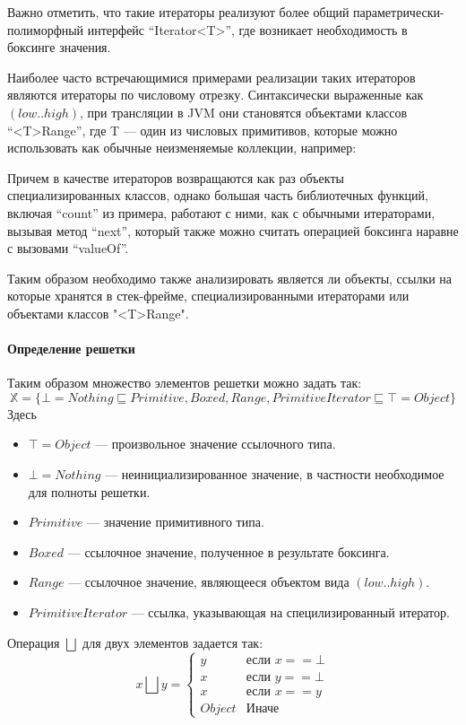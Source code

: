Важно отметить, что такие итераторы реализуют более общий параметрически-полиморфный интерфейс
``Iterator<T>'', где возникает необходимость в боксинге значения.

Наиболее часто встречающимися примерами реализации таких итераторов являются итераторы
по числовому отрезку. Синтаксически выраженные как $(low..high)$, при трансляции в JVM они
становятся объектами классов ``<T>Range'', где T --- один из числовых примитивов, которые можно
использовать как обычные неизменяемые коллекции, например:

Причем в качестве итераторов возвращаются как раз объекты специализированных классов, однако
большая часть библиотечных функций, включая ``count'' из примера, работают с ними, как с обычными
итераторами, вызывая метод ``next'', который также можно считать операцией боксинга наравне
с вызовами ``valueOf''.

Таким образом необходимо также анализировать является ли объекты, ссылки на которые хранятся
в стек-фрейме, специализированными итераторами или объектами классов "<T>Range".

\paragraph{Определение решетки}
Таким образом множество элементов решетки можно задать так:
$$\mathbb{X} = \{\bot = Nothing \sqsubseteq  Primitive, Boxed, Range, PrimitiveIterator \sqsubseteq \top = Object \}$$
Здесь
\begin{itemize}
    \item $\top = Object$ --- произвольное значение ссылочного типа.
    \item $\bot = Nothing$ --- неинициализированное значение, в частности необходимое для полноты
    решетки.
    \item $Primitive$ --- значение примитивного типа.
    \item $Boxed$ --- ссылочное значение, полученное в результате боксинга.
    \item $Range$ --- ссылочное значение, являющееся объектом вида $(low..high)$.
    \item $PrimitiveIterator$ --- ссылка, указывающая на специлизированный итератор.
\end{itemize}

Операция $\bigsqcup$ для двух элементов задается так:
$$x \bigsqcup y =
\begin{cases}
y & \text{если } x == \bot \\
x & \text{если } y == \bot \\
x & \text{если } x == y \\
Object & \textit{Иначе}
\end{cases}
$$

